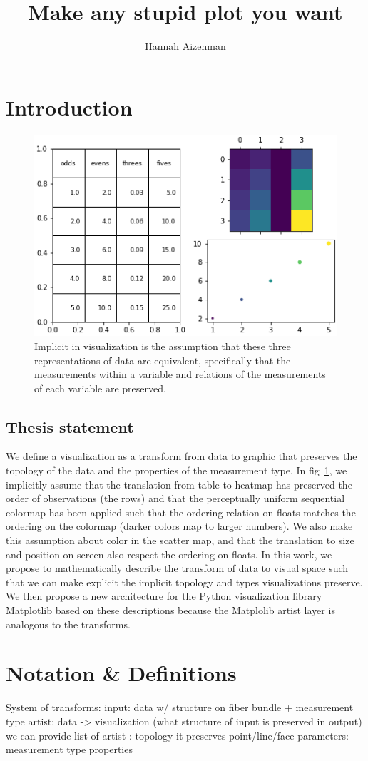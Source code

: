 \documentclass[letterpaper,onecolumn,titlepage]{Ythesis}
\title{Make any stupid plot you want}
\author{Hannah Aizenman}
\begin{document}
\makefrontmatter

\section{Introduction}
\label{sec:introduction}
\begin{figure}
    \includegraphics[width=.5\textwidth]{figures/intro/viz_same.png}
    \caption[]{Implicit in visualization is the assumption that these three representations of data are equivalent, specifically that the measurements within a variable and relations of the measurements of each variable are preserved. }
    \label{fig:viz_same}
\end{figure}

\subsection{Thesis statement}
We define a visualization as a transform from data to graphic that preserves the topology of the data and the properties of the measurement type. In fig~\ref{fig:viz_same}, we implicitly assume that the translation from table to heatmap has preserved the order of observations (the rows) and that the perceptually uniform sequential colormap has been applied such that the ordering relation on floats matches the ordering on the colormap (darker colors map to larger numbers). We also make this assumption about color in the scatter map, and that the translation to size and position on screen also respect the ordering on floats. In this work, we propose to mathematically describe the transform of data to visual space such that we can make explicit the implicit topology and types visualizations preserve. We then propose a new architecture for the Python visualization library Matplotlib \cite{hunterMatplotlib2DGraphics2007} based on these descriptions because the Matplolib artist layer is analogous to the transforms. 


\section{Notation \& Definitions}
\label{sec:hunterMatplotlib2DGraphics2007}
System of transforms:
input: data w/ structure on fiber bundle + measurement type
artist: data -> visualization
(what structure of input is preserved in output)
we can provide list of
artist : topology it preserves
point/line/face parameters: measurement type properties 
\end{document}
